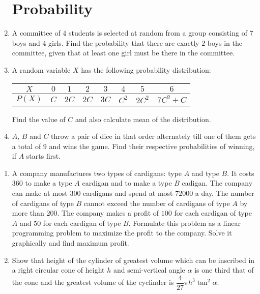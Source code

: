 \documentclass[12pt,-letter paper]{article}
\providecommand{\brak}[1]{\ensuremath{\left(#1\right)}}
\begin{document}
\begin{enumerate}
\section*{Probability}
\item A committee of $4$ students is selected at random from a group consisting of $7$ boys and $4$ girls. Find the probability that there are exactly $2$ boys in the committee, given that at least one girl must be there in the committee.
\item A random variable $X$ has the following probability distribution:
\begin{center}
\begin{tabular}{|c|c|c|c|c|c|c|c|}
\hline
$X$ & $0$ & $1$ & $2$ & $3$ & $4$ & $5$ & $6$\\
\hline
$P\brak{X}$ & $C$ & $2C$ & $2C$ & $3C$ & $C^2$ & $2C^2$ & $7C^2+C$\\
\hline
\end{tabular}
\end{center}
Find the value of $C$ and also calculate mean of the distribution.
\item $A$, $B$ and $C$ throw a pair of dice in that order alternately till one of them gets a total of $9$ and wins the game. Find their respective probabilities of winning, if $A$ starts first.
\end{enumerate}

\begin{enumerate}
\section*{Optimization}
\item A company manufactures two types of cardigans: type $A$ and type $B$. It costs \rupee$360$ to make a type $A$ cardigan and  to make a type $B$ cadigan. The company can make at most $300$ cardigans and spend at most \rupee$72000$ a day. The number of cardigans of type $B$ cannot exceed the number of cardigans of type $A$ by more than $200$. The company makes a profit of \rupee$100$ for each cardigan of type $A$ and \rupee$50$ for each cardigan of type $B$. Formulate this problem as a linear programming problem to maximize the profit to the company. Solve it graphically and find maximum profit.
\item Show that height of the cylinder of greatest volume which can be inscribed in a right circular cone of height $h$ and semi-vertical angle $\alpha$ is one third that of the cone and the greatest volume of the cyclinder is $\dfrac{4}{27}\pi h^3\tan^2\alpha$.
\end{enumerate}
\end{document}
